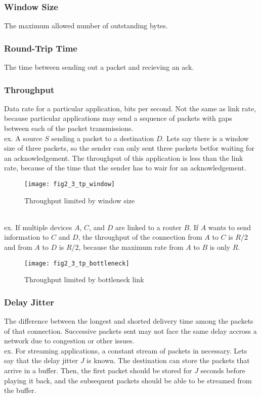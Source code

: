 \subsubsection*{Window Size}
The maximum allowed number of outstanding bytes.
\subsubsection*{Round-Trip Time}
The time between sending out a packet and recieving an ack.
\subsubsection*{Throughput}
Data rate for a particular application, bits per second. Not the same as link rate, because particular applications may send a sequence of packets with gaps between each of the packet transmissions. \\
ex. A source $S$ sending a packet to a destination $D$. Lets say there is a window size of three packets, so the sender can only sent three packets betfor waiting for an acknowledgement. The throughput of this application is less than the link rate, because of the time that the sender has to wair for an acknowledgement. 
\begin{figure}[!htbp]
    \centering
    \texttt{[image: fig2\_3\_tp\_window]}
    \caption{Throughput limited by window size}
    \label{fig:tp_window}
\end{figure}
\\ ex. If multiple devices $A$, $C$, and $D$ are linked to a router $B$. If $A$ wants to send information to $C$ and $D$, the throughput of the connection from $A$ to $C$ is $R/2$ and from $A$ to $D$ is $R/2$, because the maximum rate from $A$ to $B$ is only $R$. 
\begin{figure}[!htbp]
    \centering
    \texttt{[image: fig2\_3\_tp\_bottleneck]}
    \caption{Throughput limited by bottleneck link}
    \label{fig:tp_bottleneck}
\end{figure}

\subsubsection*{Delay Jitter}
The difference between the longest and shorted delivery time among the packets of that connection. Successive packets sent may not face the same delay accross a network due to congestion or other issues. \\
ex. For streaming applications, a constant stream of packets in necessary. Lets say that the delay jitter $J$ is known. The destination can store the packets that arrive in a buffer. Then, the first packet should be stored for $J$ seconds before playing it back, and the subsequent packets should be able to be streamed from the buffer.
